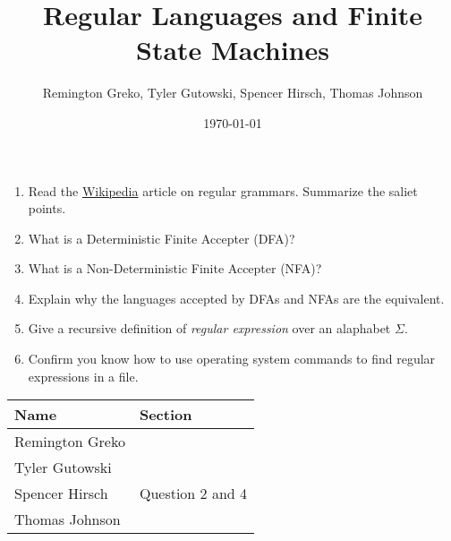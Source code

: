 \documentclass{article}
\begin{document}
\title{Regular Languages and Finite State Machines}
\author{Remington Greko, Tyler Gutowski, Spencer Hirsch, Thomas Johnson}
\date{\today}

\maketitle

\begin{enumerate}
    \item Read the \href{https://en.wikipedia.org/wiki/Regular_grammar}{Wikipedia} article on regular grammars. Summarize
            the saliet points.

    \medskip


    \medskip

    \item What is a Deterministic Finite Accepter (DFA)?
    
    \medskip


    \medskip

    \item What is a Non-Deterministic Finite Accepter (NFA)?
    
    \medskip


    \medskip

    \item Explain why the languages accepted by DFAs and NFAs are the equivalent.
    
    \medskip


    \medskip

    \item Give a recursive definition of \textit{regular expression} over
            an alaphabet $\Sigma$.

    \medskip


    \medskip

    \item Confirm you know how to use operating system commands to find
            regular expressions in a file.

    \medskip


    \medskip
\end{enumerate}

\pagebreak

\begin{center}
    \begin{tabular}{|p{3cm}|p{6cm}|}
        \hline
        \textbf{Name} & \textbf{Section} \\
        \hline
        Remington Greko &  \\
        \hline
        Tyler Gutowski &  \\
        \hline
        Spencer Hirsch &  Question 2 and 4\\
        \hline
        Thomas Johnson &  \\
        \hline
    \end{tabular}
\end{center}
\end{document}
